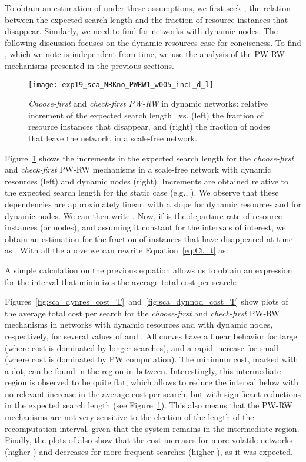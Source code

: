 \documentclass[]{elsarticle}
\begin{document}
To obtain an estimation of  under these assumptions, we first seek , the relation between the expected search length and the fraction  of resource instances that disappear. Similarly, we need to find  for networks with dynamic nodes. The following discussion focuses on the dynamic resources case for conciseness. To find , which we note is independent from time, we use the analysis of the PW-RW mechanisms presented in the previous sections.

\begin{figure}
 \centering
 \texttt{[image: exp19\_sca\_NRKno\_PWRW1\_w005\_incL\_d\_l]}
 \caption{\emph{Choose-first} and \emph{check-first PW-RW} in dynamic networks: relative increment of the expected search length \Lsexp\ vs. (left) the fraction  of resource instances  that disappear, and (right) the fraction  of nodes that leave the network, in a scale-free network.}
 \label{fig:sca_incL_d_l}
\end{figure}

Figure~\ref{fig:sca_incL_d_l} shows the increments in the expected search length for the \emph{choose-first} and \emph{check-first} PW-RW mechanisms in a scale-free network with dynamic resources (left) and dynamic nodes (right). Increments are obtained relative to the expected search length for the static case (e.g., ). We observe that these dependencies are approximately linear, with a slope  for dynamic resources and  for dynamic nodes. We can then write . Now, if  is the departure rate of resource instances (or nodes), and assuming it constant for the intervals of interest, we obtain an estimation for the fraction of instances that have disappeared at time  as . With all the above we can rewrite Equation~\ref{eq:Ct_t} as:


A simple calculation on the previous equation allows us to obtain an expression for the interval  that minimizes the average total cost per search:


Figures~\ref{fig:sca_dynres_cost_T}~and~\ref{fig:sca_dynnod_cost_T} show plots of the average total cost per search  for the \emph{choose-first} and \emph{check-first} PW-RW mechanisms in networks with dynamic resources and with dynamic nodes, respectively, for several values of  and . All curves have a linear behavior for large  (where cost is dominated by longer searches), and a rapid increase for small  (where cost is dominated by PW computation). The minimum cost, marked with a dot, can be found in the region in between. Interestingly, this intermediate region is observed to be quite flat, which allows to reduce the interval  below  with no relevant increase in the average cost per search, but with significant reductions in the expected search length (see Figure~\ref{fig:sca_incL_d_l}). This also means that the PW-RW mechanisms are not very sensitive to the election of the length  of the recomputation interval, given that the system remains in the intermediate region. Finally, the plots of  also show that the cost increases for more volatile networks (higher ) and decreases for more frequent searches (higher ), as it was expected.
\end{document}
